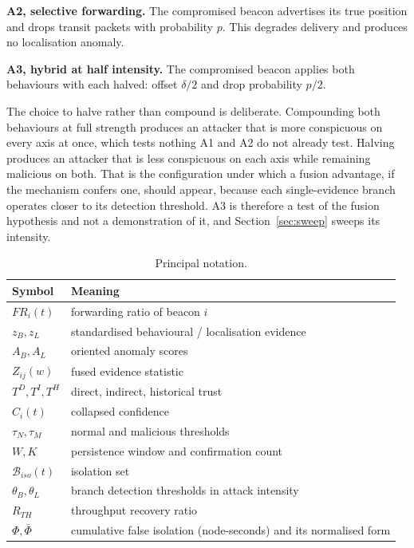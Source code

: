 \textbf{A2, selective forwarding.} The compromised beacon advertises its true
position and drops transit packets with probability $p$. This degrades
delivery and produces no localisation anomaly.

\textbf{A3, hybrid at half intensity.} The compromised beacon applies both
behaviours with each halved: offset $\delta/2$ and drop probability $p/2$.

The choice to halve rather than compound is deliberate. Compounding both
behaviours at full strength produces an attacker that is more conspicuous on
every axis at once, which tests nothing A1 and A2 do not already test.
Halving produces an attacker that is less conspicuous on each axis while
remaining malicious on both. That is the configuration under which a fusion
advantage, if the mechanism confers one, should appear, because each
single-evidence branch operates closer to its detection threshold. A3 is
therefore a test of the fusion hypothesis and not a demonstration of it,
and Section~\ref{sec:sweep} sweeps its intensity.

\begin{table}[!t]
\caption{Principal notation.}
\label{tab:notation}
\centering
\small
\begin{tabular}{@{}ll@{}}
\toprule
Symbol & Meaning \\
\midrule
$FR_i(t)$ & forwarding ratio of beacon $i$ \\
$z_B, z_L$ & standardised behavioural / localisation evidence \\
$A_B, A_L$ & oriented anomaly scores \\
$Z_{ij}(w)$ & fused evidence statistic \\
$T^D, T^I, T^H$ & direct, indirect, historical trust \\
$\hat C_i(t)$ & collapsed confidence \\
$\tau_N, \tau_M$ & normal and malicious thresholds \\
$W, K$ & persistence window and confirmation count \\
$\mathcal{B}_{iso}(t)$ & isolation set \\
$\theta_B, \theta_L$ & branch detection thresholds in attack intensity \\
$R_{TH}$ & throughput recovery ratio \\
$\Phi, \bar\Phi$ & cumulative false isolation (node-seconds) and its normalised form \\
\bottomrule
\end{tabular}
\end{table}
